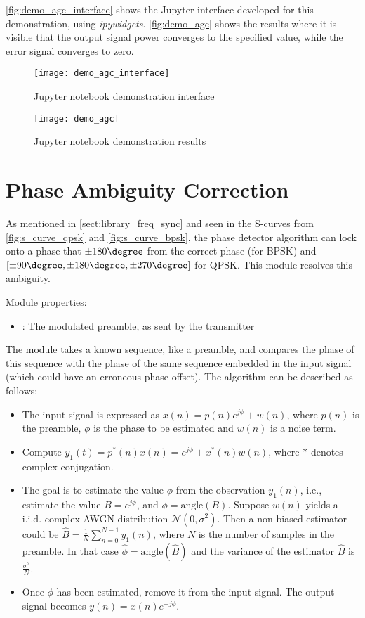 \autoref{fig:demo_agc_interface} shows the Jupyter interface developed for this demonstration, using \emph{ipywidgets}. \autoref{fig:demo_agc} shows the results where it is visible that the output signal power converges to the specified value, while the error signal converges to zero.

\begin{figure}[H]
  \centering
  \texttt{[image: demo\_agc\_interface]}
  \caption{ Jupyter notebook demonstration interface}
  \label{fig:demo_agc_interface}
\end{figure}

\begin{figure}[H]
  \centering
  \texttt{[image: demo\_agc]}
  \caption{ Jupyter notebook demonstration results}
  \label{fig:demo_agc}
\end{figure}

\section{Phase Ambiguity Correction}

As mentioned in \autoref{sect:library_freq_sync} and seen in the S-curves from \autoref{fig:s_curve_qpsk} and \autoref{fig:s_curve_bpsk}, the phase detector algorithm can lock onto a phase that $\pm 180\degree$ from the correct phase (for BPSK) and $[\pm 90\degree,\pm 180\degree,\pm 270\degree]$ for QPSK. This module resolves this ambiguity.

\noindent Module properties:
\begin{itemize}
  \item {}: The modulated preamble, as sent by the transmitter
\end{itemize}

The module takes a known sequence, like a preamble, and compares the phase of this sequence with the phase of the same sequence embedded in the input signal (which could have an erroneous phase offset). The algorithm can be described as follows:
\begin{itemize}
  \item The input signal is expressed as $x(n) = p(n)e^{j\phi} + w(n)$, where $p(n)$ is the preamble, $\phi$ is the phase to be estimated and $w(n)$ is a noise term.
  \item Compute $y_1(t) = p^*(n)x(n) = e^{j\phi} + x^*(n)w(n)$, where $*$ denotes complex conjugation.
  \item The goal is to estimate the value $\phi$ from the observation $y_1(n)$, i.e., estimate the value $B = e^{j\phi}$, and $\phi = \text{angle}(B)$. Suppose $w(n)$ yields a i.i.d. complex AWGN distribution $\mathcal{N}(0,\sigma^2)$. Then a non-biased estimator could be $\hat{B} = \frac{1}{N}\sum_{n=0}^{N-1} y_1(n)$, where $N$ is the number of samples in the preamble. In that case $\hat\phi = \text{angle}(\hat{B})$ and the variance of the estimator $\hat{B}$ is $\frac{\sigma^2}{N}$.
  \item Once $\phi$ has been estimated, remove it from the input signal. The output signal becomes $y(n) = x(n)e^{-j\phi}$.
\end{itemize}


